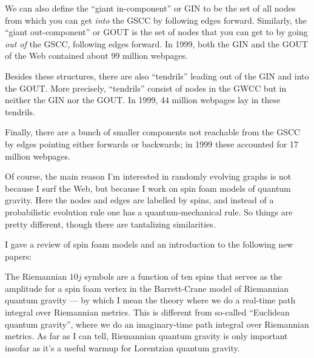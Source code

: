 \documentclass{article}
\renewcommand{\texttt}[1]{%
  \begingroup
  \ttfamily
  \begingroup\lccode`~=`/\lowercase{\endgroup\def~}{/\discretionary{}{}{}}%
  \begingroup\lccode`~=`[\lowercase{\endgroup\def~}{[\discretionary{}{}{}}%
  \begingroup\lccode`~=`.\lowercase{\endgroup\def~}{.\discretionary{}{}{}}%
  \catcode`/=\active\catcode`[=\active\catcode`.=\active
  \scantokens{#1\noexpand}%
  \endgroup
}
\begin{document}
We can also define the ``giant in-component'' or GIN to be the set of
all nodes from which you can get \emph{into} the GSCC by following edges
forward. Similarly, the ``giant out-component'' or GOUT is the set of
nodes that you can get to by going \emph{out of} the GSCC, following
edges forward. In 1999, both the GIN and the GOUT of the Web contained
about 99 million webpages.

Besides these structures, there are also ``tendrils'' leading out of the
GIN and into the GOUT. More precisely, ``tendrils'' consist of nodes in
the GWCC but in neither the GIN nor the GOUT. In 1999, 44 million
webpages lay in these tendrils.

Finally, there are a bunch of smaller components not reachable from the
GSCC by edges pointing either forwards or backwards; in 1999 these
accounted for 17 million webpages.

Of course, the main reason I'm interested in randomly evolving graphs is
not because I surf the Web, but because I work on spin foam models of
quantum gravity. Here the nodes and edges are labelled by spins, and
instead of a probabilistic evolution rule one has a quantum-mechanical
rule. So things are pretty different, though there are tantalizing
similarities.

I gave a review of spin foam models and an introduction to the following
new papers:


The Riemannian \(10j\) symbols are a function of ten spins that serves
as the amplitude for a spin foam vertex in the Barrett-Crane model of
Riemannian quantum gravity --- by which I mean the theory where we do a
real-time path integral over Riemannian metrics. This is different from
so-called ``Euclidean quantum gravity'', where we do an imaginary-time
path integral over Riemannian metrics. As far as I can tell, Riemannian
quantum gravity is only important insofar as it's a useful warmup for
Lorentzian quantum gravity.
\end{document}
